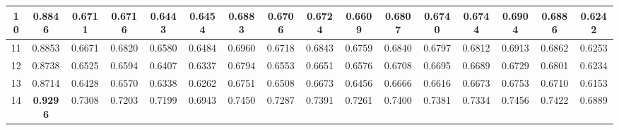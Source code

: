 \documentclass[12pt]{jarticle}
\begin{document}
\begin{table}[ht]
{\begin{tabular}{|c|c|c|c|c|c|c|c|c|c|c|c|c|c|c|c|}
      \multicolumn{1}{|c|}{10} & 0.8846 & 0.6711 & 0.6716 & 0.6443 & 0.6454 & 0.6883 & 0.6706 & 0.6724 & 0.6609 & 0.6807 & 0.6740 & 0.6744 & 0.6904 & 0.6886 & 0.6242 \\ \hline
      \multicolumn{1}{|c|}{11} & 0.8853 & 0.6671 & 0.6820 & 0.6580 & 0.6484 & 0.6960 & 0.6718 & 0.6843 & 0.6759 & 0.6840 & 0.6797 & 0.6812 & 0.6913 & 0.6862 & 0.6253 \\ \hline
      \multicolumn{1}{|c|}{12} & 0.8738 & 0.6525 & 0.6594 & 0.6407 & 0.6337 & 0.6794 & 0.6553 & 0.6651 & 0.6576 & 0.6708 & 0.6695 & 0.6689 & 0.6729 & 0.6801 & 0.6234 \\ \hline
      \multicolumn{1}{|c|}{13} & 0.8714 & 0.6428 & 0.6570 & 0.6338 & 0.6262 & 0.6751 & 0.6508 & 0.6673 & 0.6456 & 0.6666 & 0.6616 & 0.6673 & 0.6753 & 0.6710 & 0.6153 \\ \hline
      \multicolumn{1}{|c|}{14} & \textbf{0.9296} & 0.7308 & 0.7203 & 0.7199 & 0.6943 & 0.7450 & 0.7287 & 0.7391 & 0.7261 & 0.7400 & 0.7381 & 0.7334 & 0.7456 & 0.7422 & 0.6889 \\ \hline
      \end{tabular}
  }
    \end{table}
\end{document}
